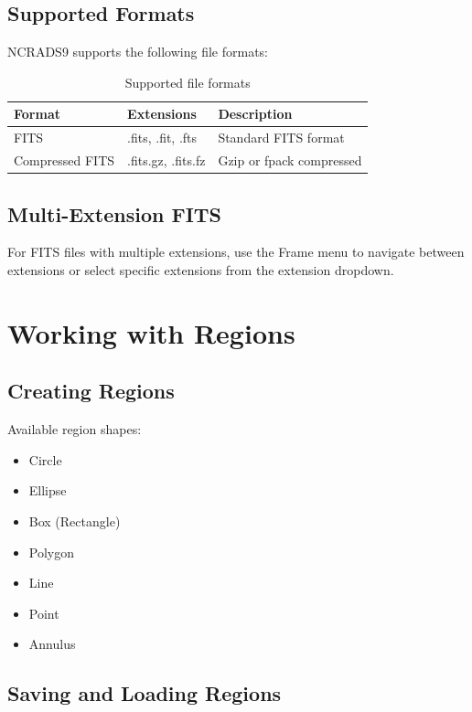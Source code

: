 \documentclass[11pt,a4paper]{report}
\begin{document}
\subsection{Supported Formats}

NCRADS9 supports the following file formats:

\begin{table}[h]
\centering
\begin{tabular}{lll}
\toprule
\textbf{Format} & \textbf{Extensions} & \textbf{Description} \\
\midrule
FITS & .fits, .fit, .fts & Standard FITS format \\
Compressed FITS & .fits.gz, .fits.fz & Gzip or fpack compressed \\
\bottomrule
\end{tabular}
\caption{Supported file formats}
\end{table}

\subsection{Multi-Extension FITS}

For FITS files with multiple extensions, use the Frame menu to navigate between extensions or select specific extensions from the extension dropdown.

\section{Working with Regions}

\subsection{Creating Regions}

Available region shapes:
\begin{itemize}
    \item Circle
    \item Ellipse
    \item Box (Rectangle)
    \item Polygon
    \item Line
    \item Point
    \item Annulus
\end{itemize}

\subsection{Saving and Loading Regions}
\end{document}

